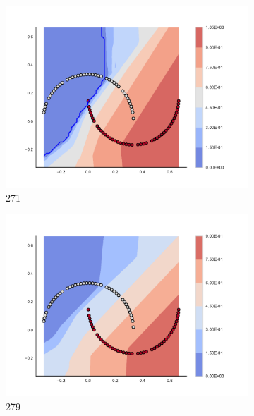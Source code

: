 \begin{figure}[h]
\begin{subfigure}[b]{0.09\textwidth}
    \includegraphics[clip, trim=2.35cm 1.75cm 4.5cm 0cm,width=\textwidth]{img/convergence/271.pdf}
    \caption{271}
    \label{fig:convergence_271}
\end{subfigure}
%
\begin{subfigure}[b]{0.09\textwidth}
    \includegraphics[clip, trim=2.35cm 1.75cm 4.5cm 0cm,width=\textwidth]{img/convergence/279.pdf}
    \caption{279}
    \label{fig:convergence_279}
\end{subfigure}
%
\begin{subfigure}[b]{0.09\textwidth}

\end{subfigure}
\end{figure}
